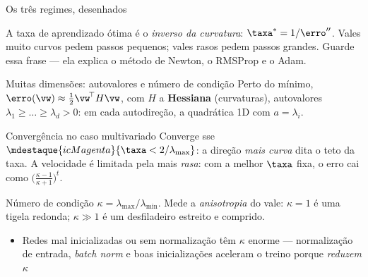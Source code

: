 \documentclass[aspectratio=169, 11pt]{beamer}
\begin{document}
\begin{frame}{Os três regimes, desenhados}
  \medskip
  \begin{ideiabox}
    A taxa de aprendizado ótima é o \emph{inverso da curvatura}:
    \(\taxa^\ast = 1/\erro''\). Vales muito curvos pedem passos pequenos; vales
    rasos pedem passos grandes. Guarde essa frase — ela explica o método de
    Newton, o RMSProp e o Adam.
  \end{ideiabox}
\end{frame}

\begin{frame}{Muitas dimensões: autovalores e número de condição}
  Perto do mínimo, \(\erro(\vw) \approx \tfrac{1}{2}\vw^{\!\top} H \vw\), com
  \(H\) a \textbf{Hessiana} (curvaturas), autovalores \(\lambda_1 \ge \dots \ge
  \lambda_d > 0\): em cada autodireção, a quadrática 1D com \(a = \lambda_i\).

  \begin{teobox}{Convergência no caso multivariado}
    Converge sse \(\mdestaque{icMagenta}{\taxa < 2/\lambda_{\max}}\): a direção
    \emph{mais curva} dita o teto da taxa. A velocidade é limitada pela mais
    \emph{rasa}: com a melhor \(\taxa\) fixa, o erro cai como
    \(\bigl(\tfrac{\kappa - 1}{\kappa + 1}\bigr)^{t}\).
  \end{teobox}

  \begin{defbox}{Número de condição}
    \(\kappa = \lambda_{\max} / \lambda_{\min}\). Mede a \emph{anisotropia} do
    vale: \(\kappa = 1\) é uma tigela redonda; \(\kappa \gg 1\) é um desfiladeiro
    estreito e comprido.
  \end{defbox}

  \begin{itemize}\setlength{\itemsep}{0.2ex}
    \item Redes mal inicializadas ou sem normalização têm \(\kappa\) enorme —
          normalização de entrada, \emph{batch norm} e boas inicializações
          aceleram o treino porque \emph{reduzem} \(\kappa\)
  \end{itemize}
\end{frame}
\end{document}
